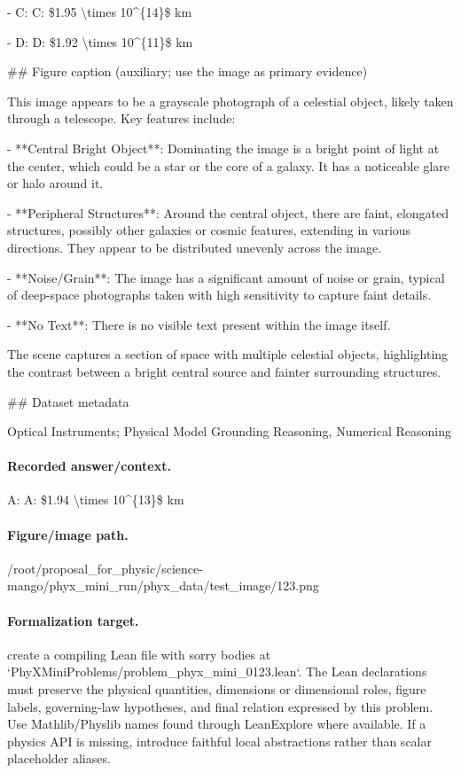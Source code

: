 - C: C: \$1.95 \textbackslash{}times 10\textasciicircum{}\{14\}\$ km

- D: D: \$1.92 \textbackslash{}times 10\textasciicircum{}\{11\}\$ km

\#\# Figure caption (auxiliary; use the image as primary evidence)

This image appears to be a grayscale photograph of a celestial object, likely taken through a telescope. Key features include:

- **Central Bright Object**: Dominating the image is a bright point of light at the center, which could be a star or the core of a galaxy. It has a noticeable glare or halo around it.
  
- **Peripheral Structures**: Around the central object, there are faint, elongated structures, possibly other galaxies or cosmic features, extending in various directions. They appear to be distributed unevenly across the image.

- **Noise/Grain**: The image has a significant amount of noise or grain, typical of deep-space photographs taken with high sensitivity to capture faint details.

- **No Text**: There is no visible text present within the image itself.

The scene captures a section of space with multiple celestial objects, highlighting the contrast between a bright central source and fainter surrounding structures.

\#\# Dataset metadata

Optical Instruments; Physical Model Grounding Reasoning, Numerical Reasoning

\paragraph{Recorded answer/context.}
A: A: \$1.94 \textbackslash{}times 10\textasciicircum{}\{13\}\$ km

\paragraph{Figure/image path.}
/root/proposal\_for\_physic/science-mango/phyx\_mini\_run/phyx\_data/test\_image/123.png

\paragraph{Formalization target.}
create a compiling Lean file with sorry bodies at `PhyXMiniProblems/problem\_phyx\_mini\_0123.lean`. The Lean declarations must preserve the physical quantities, dimensions or dimensional roles, figure labels, governing-law hypotheses, and final relation expressed by this problem.
Use Mathlib/Physlib names found through LeanExplore where available. If a physics API is missing, introduce faithful local abstractions rather than scalar placeholder aliases.

